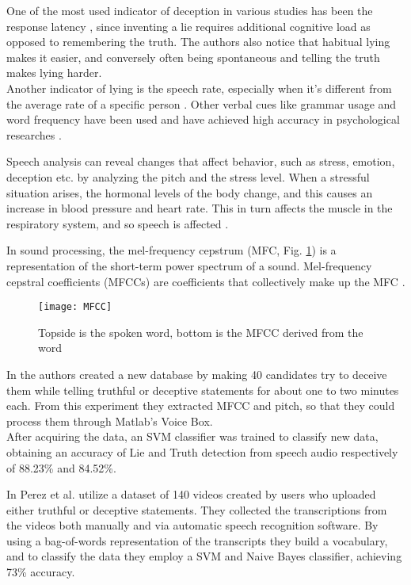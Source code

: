 One of the most used indicator of deception in various studies has been the response latency \cite{EaseLying}, since inventing a lie requires additional cognitive load as opposed to remembering the truth. The authors also notice that habitual lying makes it easier, and conversely often being spontaneous and telling the truth makes lying harder.\\
Another indicator of lying is the speech rate, especially when it's different from the average rate of a specific person \cite{TemporalCues}. Other verbal cues like grammar usage and word frequency have been used and have achieved high accuracy in psychological researches \cite{PorterTruthLying}.

Speech analysis can reveal changes that affect behavior, such as stress, emotion, deception etc. by analyzing the pitch and the stress level. When a stressful situation arises, the hormonal levels of the body change, and this causes an increase in blood pressure and heart rate. This in turn affects the muscle in the respiratory system, and so speech is affected \cite{norena}.

In sound processing, the mel-frequency cepstrum (MFC, Fig. \ref{fig:MFCC}) is a representation of the short-term power spectrum of a sound. Mel-frequency cepstral coefficients (MFCCs) are coefficients that collectively make up the MFC \cite{wiki:mfcc}.

\begin{figure}[H]
	\centering
	\texttt{[image: MFCC]}
	\caption{Topside is the spoken word, bottom is the MFCC derived from the word}
	\label{fig:MFCC}
\end{figure}

In \cite{relidss} the authors created a new database by making 40 candidates try to deceive them while telling truthful or deceptive statements for about one to two minutes each. From this experiment they extracted MFCC and pitch, so that they could process them through Matlab's Voice Box. \\
After acquiring the data, an SVM classifier was trained to classify new data, obtaining an accuracy of Lie and Truth detection from speech audio respectively of 88.23\% and 84.52\%.

In \cite{Mihalcea:2013:ADD:2522848.2522888} Perez et al. utilize a dataset of 140 videos created by users who uploaded either truthful or deceptive statements. They collected the transcriptions from the videos both manually and via automatic speech recognition software. By using a bag-of-words representation of the transcripts they build a vocabulary, and to classify the data they employ a SVM and Naive Bayes classifier, achieving 73\% accuracy.

